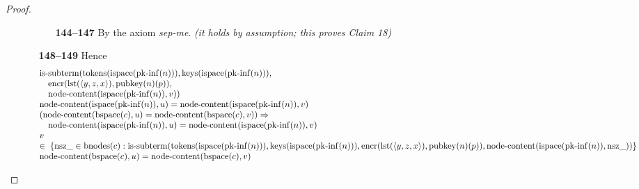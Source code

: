 \documentclass[11pt]{article}
\theoremstyle{plain}
\begin{document}
\begin{proof}
\begin{itemize}[leftmargin=2.8em, itemsep=4pt, parsep=1pt]
\begin{itemize}[leftmargin=2.8em, itemsep=4pt, parsep=1pt]
  \begin{itemize}[leftmargin=2.8em, itemsep=4pt, parsep=1pt]
  \item[\textbf{144--147}] By the axiom \emph{sep-me}.  \emph{(it holds by assumption; this proves Claim 18)}
  \end{itemize}
  \item[\textbf{148--149}] Hence 
\begin{equation*}
\begin{array}{@{}l@{}}
\begin{array}{@{}l@{}} \operatorname{is\text{-}subterm}(\operatorname{tokens}(\operatorname{ispace}(\operatorname{pk\text{-}inf}(n))), \operatorname{keys}(\operatorname{ispace}(\operatorname{pk\text{-}inf}(n))), \\ \quad \operatorname{encr}(\operatorname{lst}(\langle y, z, x \rangle), \operatorname{pubkey}(n)(p)), \\ \quad \operatorname{node\text{-}content}(\operatorname{ispace}(\operatorname{pk\text{-}inf}(n)), v)) \end{array} \\
\operatorname{node\text{-}content}(\operatorname{ispace}(\operatorname{pk\text{-}inf}(n)), u) = \operatorname{node\text{-}content}(\operatorname{ispace}(\operatorname{pk\text{-}inf}(n)), v) \\
\begin{array}{@{}l@{}} (\operatorname{node\text{-}content}(\operatorname{bspace}(c), u) = \operatorname{node\text{-}content}(\operatorname{bspace}(c), v)) \Rightarrow  \\ \quad \operatorname{node\text{-}content}(\operatorname{ispace}(\operatorname{pk\text{-}inf}(n)), u) = \operatorname{node\text{-}content}(\operatorname{ispace}(\operatorname{pk\text{-}inf}(n)), v) \end{array} \\
\begin{array}{@{}l@{}} v \\ \in\; \{\operatorname{nsz\_} \in \operatorname{bnodes}(c) : \operatorname{is\text{-}subterm}(\operatorname{tokens}(\operatorname{ispace}(\operatorname{pk\text{-}inf}(n))), \operatorname{keys}(\operatorname{ispace}(\operatorname{pk\text{-}inf}(n))), \operatorname{encr}(\operatorname{lst}(\langle y, z, x \rangle), \operatorname{pubkey}(n)(p)), \operatorname{node\text{-}content}(\operatorname{ispace}(\operatorname{pk\text{-}inf}(n)), \operatorname{nsz\_}))\} \end{array} \\
\operatorname{node\text{-}content}(\operatorname{bspace}(c), u) = \operatorname{node\text{-}content}(\operatorname{bspace}(c), v) \\

\end{array}
\end{equation*}
\end{itemize}
\end{itemize}
\end{proof}
\end{document}
